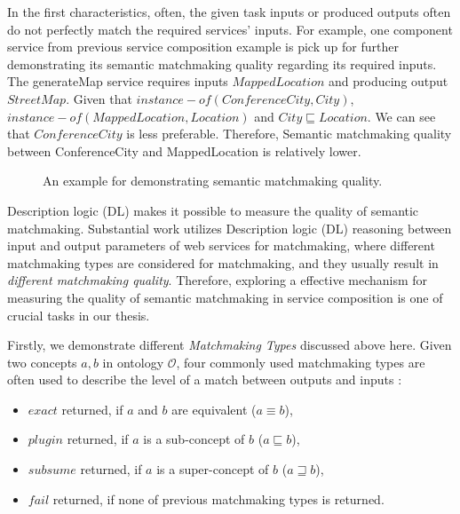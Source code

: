 In the first characteristics, often, the given task inputs or produced outputs often do not perfectly match the required services' inputs. For example, one component service from previous service composition example is pick up for further demonstrating its semantic matchmaking quality regarding its required inputs. The generateMap service requires inputs $MappedLocation$ and producing output $StreetMap$. Given that $instance-of (ConferenceCity,City)$, $instance-of (MappedLocation, Location)$ and $City \sqsubseteq Location$. We can see that $ConferenceCity$ is less preferable. Therefore, Semantic matchmaking quality between ConferenceCity and  MappedLocation is relatively lower. 

\begin{figure}
\centerline{
}
\caption{An example for demonstrating semantic matchmaking quality.}
\label{fig:sm_example}
\end{figure}

Description logic (DL) makes it possible to measure the quality of semantic matchmaking. Substantial work \cite{bansal2016generalized,lecue2009optimizing, lecue2007making, lecue2006formal, rao2005semantic} utilizes Description logic (DL) reasoning between input and output parameters of web services for matchmaking, where different matchmaking types are considered for matchmaking, and they usually result in \emph{different matchmaking quality}. Therefore, exploring a effective mechanism for measuring the quality of semantic matchmaking in service composition is one of crucial tasks in our thesis. 

Firstly, we demonstrate different \emph{Matchmaking Types} discussed above here. Given two concepts $a, b$ in ontology $\mathcal{O}$, four commonly used matchmaking types are often used to describe the level of a match between outputs and inputs \cite{paolucci2002semantic}: 
\begin{itemize}
\item $exact$ returned, if $a$ and $b$ are equivalent ($a \equiv b$), 
\item $plugin$ returned, if $a$ is a sub-concept of $b$ ($a \sqsubseteq b$),
\item $subsume$ returned, if $a$ is a super-concept of $b$ ($a \sqsupseteq b$), 
\item $fail$ returned, if none of previous matchmaking types is returned. 
\end{itemize}

